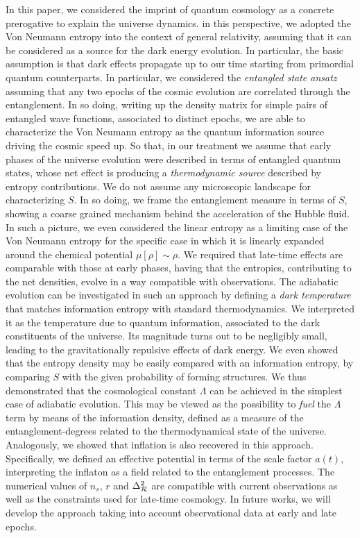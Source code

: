 \documentclass[nofootinbib,prd,superscriptaddress,showpacs,showkeys,]{revtex4}
\begin{document}
In this paper, we considered the imprint of quantum cosmology as a concrete prerogative to explain the universe dynamics. in this perspective, we adopted the  Von Neumann entropy into the context of general relativity, assuming that it can be considered as a source for the dark energy evolution. In particular, the basic assumption is that   dark effects propagate  up to our time starting from primordial quantum counterparts. In particular, we considered  the \textit{entangled state ansatz} assuming  that any  two epochs of the cosmic evolution are correlated  through the entanglement. In so doing, writing up the density matrix for  simple pairs of entangled wave functions, associated to distinct epochs, we are able to characterize the Von Neumann entropy as the  quantum information source driving the cosmic speed up. So that, in our treatment we assume that early phases of the universe evolution were described in terms of entangled quantum states, whose net effect is producing a \emph{thermodynamic source} described by  entropy contributions. We do not assume any microscopic landscape for characterizing $S$. In so doing, we frame the entanglement measure in terms of $S$, showing a coarse grained mechanism behind the  acceleration of the Hubble fluid. In such a picture, we even considered the linear entropy as a limiting case of the Von Neumann entropy for the specific case in which it is linearly expanded around the chemical potential $\mu[\rho]\sim\rho$. We required that late-time effects are comparable with those at early phases, having that the entropies, contributing to the net densities, evolve in a way compatible with observations. The adiabatic evolution can be investigated in such an approach   by defining a  {\it dark temperature} that matches information entropy   with standard thermodynamics. We interpreted it as the temperature due to quantum information, associated to the dark constituents of the universe. Its magnitude turns out to be negligibly small, leading to the gravitationally repulsive effects of dark energy. We even showed that the entropy density may be easily compared with an information entropy, by comparing $S$ with the given probability of forming structures.  We thus demonstrated that the cosmological constant $\Lambda$ can be  achieved in the simplest case of adiabatic evolution. This may be viewed as the possibility to \emph{fuel} the $\Lambda$ term by means of the information density, defined as a measure of the entanglement-degrees related to the thermodynamical state of the universe. Analogously, we showed that inflation is also recovered in this approach. Specifically, we defined an effective potential in terms of the scale factor $a(t)$, interpreting the inflaton as a field related to the entanglement processes. The numerical values of $n_s$, $r$ and $\Delta^2_{\cal R}$ are compatible with current observations as well as the constraints used for late-time cosmology.
In future works, we will develop the approach taking into account observational data at early and late epochs.
\end{document}
